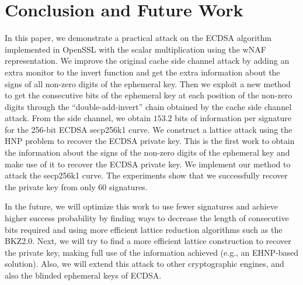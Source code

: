 \section{Conclusion and Future Work}
\label{sec:conclusion}
In this paper, we demonstrate a practical attack on the ECDSA algorithm implemented in OpenSSL with the scalar multiplication using the wNAF representation.
We improve the original cache side channel attack
 by adding an extra monitor to the invert function and get the extra information about the signs of all non-zero digits of the ephemeral key.
Then we exploit a new method to get the consecutive bits of the ephemeral key at each position of the non-zero digits through the ``double-add-invert'' chain obtained by the cache side channel attack.
From the side channel, we obtain $153.2$ bits of information per signature for the 256-bit ECDSA secp256k1 curve.
We construct a lattice attack using the HNP problem to recover the ECDSA private key.
This is the first work to obtain the information about the signs of the non-zero digits of the ephemeral key and make use of it to recover the ECDSA private key.
We implement our method to attack the secp256k1 curve.
The experiments show that we successfully recover the private key from only $60$ signatures.

In the future,
we will optimize this work to use fewer signatures and achieve higher success probability by finding ways to decrease the length of consecutive bits required and using more efficient lattice reduction algorithms such as the BKZ2.0.
Next, we will try to find a more efficient lattice construction to recover the private key,
    making full use of the information achieved (e.g., an EHNP-based solution).
Also, we will extend this attack to other cryptographic engines,
    and also the blinded ephemeral keys of ECDSA.



